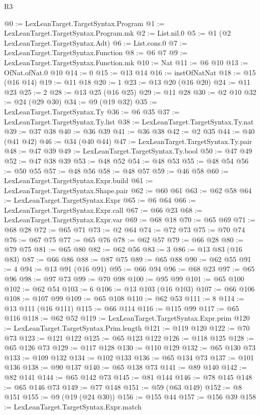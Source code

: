 \begin{lexlean}{R3}
\begin{coremodule}
@0 := LexLeanTarget.TargetSyntax.Program
@1 := LexLeanTarget.TargetSyntax.Program.mk
@2 := List.nil.{0}
@5 := @1 (@2 LexLeanTarget.TargetSyntax.Adt)
@6 := List.cons.{0}
@7 := LexLeanTarget.TargetSyntax.Function
@8 := @6 @7
@9 := LexLeanTarget.TargetSyntax.Function.mk
@10 := Nat
@11 := @6 @10
@13 := OfNat.ofNat.{0} @10
@14 := 0
@15 := @13 @14
@16 := instOfNatNat
@18 := @15 (@16 @14)
@19 := @11 @18
@20 := 1
@23 := @13 @20 (@16 @20)
@24 := @11 @23
@25 := 2
@28 := @13 @25 (@16 @25)
@29 := @11 @28
@30 := @2 @10
@32 := @24 (@29 @30)
@34 := @9 (@19 @32)
@35 := LexLeanTarget.TargetSyntax.Ty
@36 := @6 @35
@37 := LexLeanTarget.TargetSyntax.Ty.list
@38 := LexLeanTarget.TargetSyntax.Ty.nat
@39 := @37 @38
@40 := @36 @39
@41 := @36 @38
@42 := @2 @35
@44 := @40 (@41 @42)
@46 := @34 (@40 @44)
@47 := LexLeanTarget.TargetSyntax.Ty.pair
@48 := @47 @39
@49 := LexLeanTarget.TargetSyntax.Ty.bool
@50 := @47 @49
@52 := @47 @38 @39
@53 := @48 @52
@54 := @48 @53
@55 := @48 @54
@56 := @50 @55
@57 := @48 @56
@58 := @48 @57
@59 := @46 @58
@60 := LexLeanTarget.TargetSyntax.Expr.build
@61 := LexLeanTarget.TargetSyntax.Shape.pair
@62 := @60 @61
@63 := @62 @58
@64 := LexLeanTarget.TargetSyntax.Expr
@65 := @6 @64
@66 := LexLeanTarget.TargetSyntax.Expr.call
@67 := @66 @23
@68 := LexLeanTarget.TargetSyntax.Expr.var
@69 := @68 @18
@70 := @65 @69
@71 := @68 @28
@72 := @65 @71
@73 := @2 @64
@74 := @72 @73
@75 := @70 @74
@76 := @67 @75
@77 := @65 @76
@78 := @62 @57
@79 := @66 @28
@80 := @79 @75
@81 := @65 @80
@82 := @62 @56
@83 := 3
@86 := @13 @83 (@16 @83)
@87 := @66 @86
@88 := @87 @75
@89 := @65 @88
@90 := @62 @55
@91 := 4
@94 := @13 @91 (@16 @91)
@95 := @66 @94
@96 := @68 @23
@97 := @65 @96
@98 := @97 @73
@99 := @70 @98
@100 := @95 @99
@101 := @65 @100
@102 := @62 @54
@103 := 6
@106 := @13 @103 (@16 @103)
@107 := @66 @106
@108 := @107 @99
@109 := @65 @108
@110 := @62 @53
@111 := 8
@114 := @13 @111 (@16 @111)
@115 := @66 @114
@116 := @115 @99
@117 := @65 @116
@118 := @62 @52
@119 := LexLeanTarget.TargetSyntax.Expr.prim
@120 := LexLeanTarget.TargetSyntax.Prim.length
@121 := @119 @120
@122 := @70 @73
@123 := @121 @122
@125 := @65 @123 @122
@126 := @118 @125
@128 := @65 @126 @73
@129 := @117 @128
@130 := @110 @129
@132 := @65 @130 @73
@133 := @109 @132
@134 := @102 @133
@136 := @65 @134 @73
@137 := @101 @136
@138 := @90 @137
@140 := @65 @138 @73
@141 := @89 @140
@142 := @82 @141
@144 := @65 @142 @73
@145 := @81 @144
@146 := @78 @145
@148 := @65 @146 @73
@149 := @77 @148
@151 := @59 (@63 @149)
@152 := @8 @151
@155 := @9 (@19 (@24 @30))
@156 := @155 @44
@157 := @156 @39
@158 := LexLeanTarget.TargetSyntax.Expr.match

\end{coremodule}
\end{lexlean}
